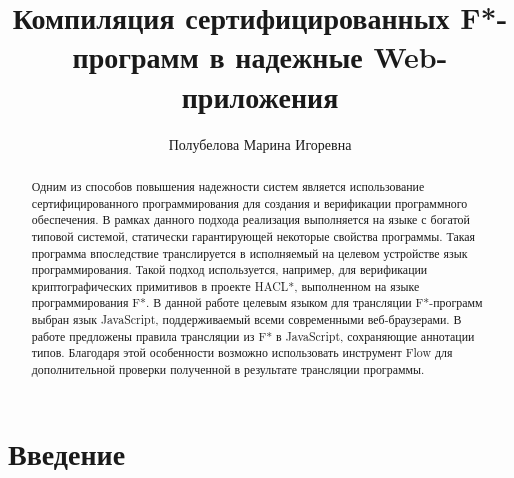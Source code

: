 \title{Компиляция сертифицированных F*-программ в надежные Web-приложения}


\author{Полубелова Марина Игоревна}



\maketitle

\begin{abstract}
Одним из способов повышения надежности систем является использование
сертифицированного программирования для создания и верификации программного
обеспечения. В рамках данного подхода реализация выполняется на языке с богатой
типовой системой, статически гарантирующей некоторые свойства программы. Такая
программа впоследствие транслируется в исполняемый на целевом устройстве язык
программирования. Такой подход используется, например, для верификации
криптографических примитивов в проекте HACL*, выполненном на языке
программирования F*. В данной работе целевым языком для трансляции F*-программ
выбран язык JavaScript, поддерживаемый всеми современными веб-браузерами. В
работе предложены правила трансляции из F* в JavaScript, сохраняющие аннотации
типов. Благодаря этой особенности возможно использовать инструмент Flow для
дополнительной проверки полученной в результате трансляции программы.
\end{abstract}




 

\section*{Введение}

